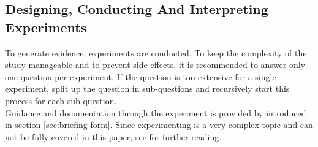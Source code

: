 
\subsection{Designing, Conducting And Interpreting Experiments}
\label{subsec:designing conducting and interpreting experiment}
To generate evidence, experiments are conducted. To keep the complexity of the study manageable and to prevent side effects, it is recommended to answer only one question per experiment. If the question is too extensive for a single experiment, split up the question in sub-questions and recursively start this process for each sub-question.\\
Guidance and documentation through the experiment is provided by \briefingform{} introduced in section \ref{sec:briefing form}. Since experimenting is a very complex topic and can not be fully covered in this paper, see \cite{Wohlin2012,Tullis2013} for further reading.